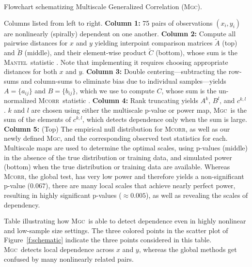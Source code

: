\documentclass[11pt]{article}
\newcommand{\note}[2][]{\added[#1,remark={#2}]{}}
\providecommand{\sct}[1]{{\normalfont\textsc{#1}}}
\newcommand{\G}{c}
\newcommand{\Mgc}{\sct{Mgc}}
\newcommand{\Mcorr}{\sct{Mcorr}}
\newcommand{\Mantel}{\sct{Mantel}}
\newcommand{\cs}[1]{{\note{cs: #1}}}
\begin{document}
\cs{i hacked this because i couldn't get the caption on the same page and i was on a flight.  i think there is a package for next page captions, but i'm not online as i do this.  one of us should fix this. also, i still might want spiral, i gotta decide}


Flowchart schematizing Multiscale Generalized Correlation (\Mgc). 

Columns listed from left to right.
\textbf{Column 1:} 75 pairs of observations $(x_i,y_i)$ are nonlinearly (spirally) dependent on one another.
% 
\textbf{Column 2:} Compute all pairwise distances for $x$ and $y$ yielding interpoint comparison matrices
 $\tilde{A}$ (top) and $\tilde{B}$ (middle), 
and their element-wise product $\tilde{C}$ (bottom), whose sum is the  \Mantel~statistic \cite{Mantel1967}.
Note that implementing it requires choosing appropriate distances for both $x$ and $y$.  
% 
\textbf{Column 3:} Double centering---subtracting the row-sums and column-sums to eliminate bias due to individual samples---yields $A=\{a_{ij}\}$ and $B=\{b_{ij}\}$, which we use to compute $C$, whose sum is the un-normalized \Mcorr~statistic \cite{SzekelyRizzo2013a}.
% 
\textbf{Column 4:} Rank truncating yields $A^{k}$, $B^{l}$, and $\G^{k,l}$.  $k$ and $l$ are chosen using either the multiscale p-value or power map, \Mgc~is the sum of the elements of $\G^{k,l}$, which detects dependence only when the sum is large.
\textbf{Column 5:} (Top) The empirical null distribution for \Mcorr, as well as our newly defined \Mgc, and the corresponding observed test statistics for each. 
Multiscale  maps are used to determine the optimal scales, using p-values (middle)  in the absence of the true distribution or training data, and simulated power (bottom) when the true distribution or training data are available.  
Whereas \Mcorr, the global test, has very low power and therefore yields a non-significant p-value ($0.067$),  there are many local scales that achieve nearly perfect power, resulting in highly significant p-values ($\approx 0.005$), as well as revealing the scales of dependency.


Table illustrating how \Mgc~is able to detect dependence even in highly nonlinear and low-sample size settings. The three colored points in the scatter plot of Figure~\ref{f:schematic} indicate the three points considered in this table. \Mgc~detects local dependence across $x$ and $y$, whereas the global methods get confused by many nonlinearly related pairs.
\end{document}
